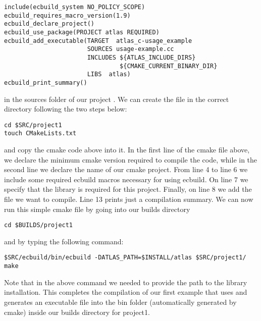 \begin{description}
\begin{lstlisting}[style=XMLStyle]
include(ecbuild_system NO_POLICY_SCOPE)
ecbuild_requires_macro_version(1.9)
ecbuild_declare_project()
ecbuild_use_package(PROJECT atlas REQUIRED)
ecbuild_add_executable(TARGET  atlas_c-usage_example
                       SOURCES usage-example.cc 
                       INCLUDES ${ATLAS_INCLUDE_DIRS}
                                ${CMAKE_CURRENT_BINARY_DIR}
                       LIBS  atlas)
ecbuild_print_summary()
\end{lstlisting}
in the sources folder of our project .
We can create the  file in the correct 
directory following the two steps below:
%
\begin{lstlisting}[style=BashStyle]
cd $SRC/project1
touch CMakeLists.txt
\end{lstlisting}
%
and copy the cmake code above into it.
In the first line of the cmake file above, we declare the minimum 
cmake version required to compile the code, while in the second 
line we declare the name of our cmake project. 
From line 4 to line 6 we include some required ecbuild macros 
necessary for using ecbuild. On line 7 we specify that the 
\Atlas library is required for this project. Finally, on line 
8 we  add the file we want to compile. Line 13 prints just a 
compilation summary.
We can now run this simple cmake file by going into our builds 
directory 
%
\begin{lstlisting}[style=BashStyle]
cd $BUILDS/project1
\end{lstlisting}
%  
and by typing the following command:
%
\begin{lstlisting}[style=BashStyle]
$SRC/ecbuild/bin/ecbuild -DATLAS_PATH=$INSTALL/atlas $SRC/project1/
make 
\end{lstlisting}
%  
Note that in the above command we needed to provide the path 
to the \Atlas library installation. This completes the compilation 
of our first example that uses \Atlas and generates an executable 
file into the bin folder (automatically generated by cmake) 
inside our builds directory for project1.
\end{description}
%

